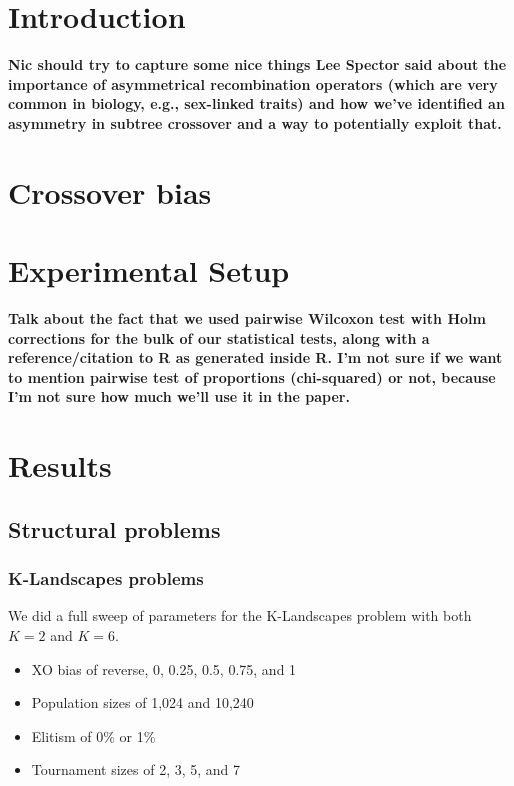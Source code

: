 \documentclass{sig-alternate}
\begin{document}
\category{}{}{}
\terms{}

\section{Introduction} \label{sec:Introduction}

\textbf{Nic should try to capture some nice things Lee Spector said about the importance of asymmetrical 
recombination operators (which are very common in biology, e.g., sex-linked traits) and how we've identified an 
asymmetry in subtree crossover and a way to potentially exploit that.}

\section{Crossover bias} \label{sec:XObias}

\section{Experimental Setup} \label{sec:Experiments}

\textbf{Talk about the fact that we used pairwise Wilcoxon test with Holm corrections for the bulk of our statistical 
tests, along with a reference/citation to R as generated inside R. I'm not sure if we want to mention pairwise test of 
proportions (chi-squared) or not, because I'm not sure how much we'll use it in the paper.}

\section{Results} \label{sec:Results}

\subsection{Structural problems}

\subsubsection{K-Landscapes problems}

We did a full sweep of parameters for the K-Landscapes problem with both $K=2$ and $K=6$.

\begin{itemize}
	\item XO bias of reverse, 0, 0.25, 0.5, 0.75, and 1
	\item Population sizes of 1,024 and 10,240
	\item Elitism of 0\% or 1\%
	\item Tournament sizes of 2, 3, 5, and 7
\end{itemize}
\end{document}
